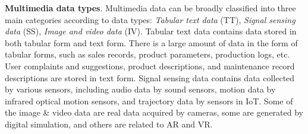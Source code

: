 \documentclass[a4paper,fleqn]{cas-dc}
\begin{document}
\textbf{Multimedia data types}. Multimedia data can be broadly classified into three main categories according to data types: \textit{Tabular text data} (TT), \textit{Signal sensing data} (SS), \textit{Image and video data} (IV).
Tabular text data contains data stored in both tabular form and text form.
There is a large amount of data in the form of tabular forms, such as sales records, product parameters, production logs, etc. User complaints and suggestions, product descriptions, and maintenance record descriptions are stored in text form.
Signal sensing data contains data collected by various sensors, including audio data by sound sensors, motion data by infrared optical motion sensors, and trajectory data by sensors in IoT.
Some of the image \& video data are real data acquired by cameras, some are generated by digital simulation, and others are related to AR and VR.
\end{document}
